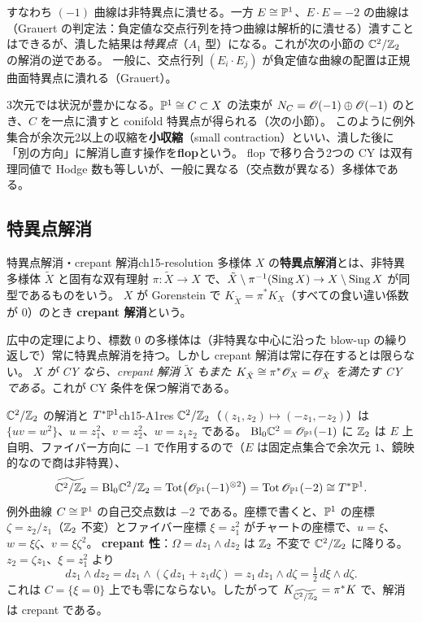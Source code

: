 すなわち $(-1)$ 曲線は非特異点に潰せる。一方 $E\cong\mathbb{P}^1$、$E\cdot E = -2$ の曲線は（Grauert の判定法：負定値な交点行列を持つ曲線は解析的に潰せる）潰すことはできるが、潰した結果は\emph{特異点}（$A_1$ 型）になる。これが次の小節の $\mathbb{C}^2/\mathbb{Z}_2$ の解消の逆である。
一般に、交点行列 $(E_i\cdot E_j)$ が負定値な曲線の配置は正規曲面特異点に潰れる（Grauert）。

3次元では状況が豊かになる。$\mathbb{P}^1\cong C\subset X$ の法束が $N_C = \mathscr{O}(-1)\oplus\mathscr{O}(-1)$ のとき、$C$ を一点に潰すと conifold 特異点が得られる（次の小節）。
このように例外集合が余次元2以上の収縮を\textbf{小収縮}（small contraction）といい、潰した後に「別の方向」に解消し直す操作を\textbf{flop}という。
flop で移り合う2つの CY は双有理同値で Hodge 数も等しいが、一般に異なる（交点数が異なる）多様体である。

\subsection{特異点解消}

\begin{mydef}{特異点解消・crepant 解消}{ch15-resolution}
多様体 $X$ の\textbf{特異点解消}とは、非特異多様体 $\tilde X$ と固有な双有理射 $\pi:\tilde X\to X$ で、$\tilde X\setminus\pi^{-1}(\operatorname{Sing} X)\to X\setminus\operatorname{Sing} X$ が同型であるものをいう。
$X$ が Gorenstein で $K_{\tilde X} = \pi^*K_X$（すべての食い違い係数が $0$）のとき \textbf{crepant 解消}という。
\end{mydef}

広中の定理により、標数 $0$ の多様体は（非特異な中心に沿った blow-up の繰り返しで）常に特異点解消を持つ。しかし crepant 解消は常に存在するとは限らない。
\emph{$X$ が CY なら、crepant 解消 $\tilde X$ もまた $K_{\tilde X}\cong\pi^*\mathscr{O}_X = \mathscr{O}_{\tilde X}$ を満たす CY である}。これが CY 条件を保つ解消である。

\begin{myex}{$\mathbb{C}^2/\mathbb{Z}_2$ の解消と $T^*\mathbb{P}^1$}{ch15-A1res}
$\mathbb{C}^2/\mathbb{Z}_2$（$(z_1,z_2)\mapsto(-z_1,-z_2)$）は $\{uv = w^2\}$、$u = z_1^2$、$v = z_2^2$、$w = z_1z_2$ である。
$\mathrm{Bl}_0\mathbb{C}^2 = \mathscr{O}_{\mathbb{P}^1}(-1)$ に $\mathbb{Z}_2$ は $E$ 上自明、ファイバー方向に $-1$ で作用するので（$E$ は固定点集合で余次元 $1$、鏡映的なので商は非特異）、
\[
\widetilde{\mathbb{C}^2/\mathbb{Z}_2} = \mathrm{Bl}_0\mathbb{C}^2/\mathbb{Z}_2 = \text{Tot}\big(\mathscr{O}_{\mathbb{P}^1}(-1)^{\otimes2}\big) = \text{Tot}\,\mathscr{O}_{\mathbb{P}^1}(-2)\cong T^*\mathbb{P}^1 .
\]
例外曲線 $C\cong\mathbb{P}^1$ の自己交点数は $-2$ である。座標で書くと、$\mathbb{P}^1$ の座標 $\zeta = z_2/z_1$（$\mathbb{Z}_2$ 不変）とファイバー座標 $\xi = z_1^2$ がチャートの座標で、$u = \xi$、$w = \xi\zeta$、$v = \xi\zeta^2$。
\textbf{crepant 性}：$\Omega = dz_1\wedge dz_2$ は $\mathbb{Z}_2$ 不変で $\mathbb{C}^2/\mathbb{Z}_2$ に降りる。$z_2 = \zeta z_1$、$\xi = z_1^2$ より
\[
dz_1\wedge dz_2 = dz_1\wedge(\zeta\,dz_1 + z_1d\zeta) = z_1\,dz_1\wedge d\zeta = \tfrac12\,d\xi\wedge d\zeta .
\]
これは $C = \{\xi = 0\}$ 上でも零にならない。したがって $K_{\widetilde{\mathbb{C}^2/\mathbb{Z}_2}} = \pi^*K$ で、解消は crepant である。
\end{myex}

